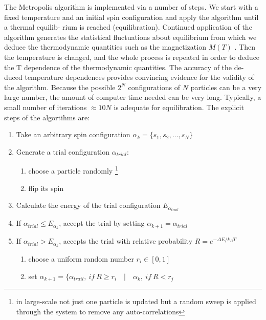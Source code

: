 \documentclass[12pt]{article}
\theoremstyle{plain}
\begin{document}
\vspace{2mm}

\par The Metropolis algorithm is implemented via a number of steps. We start with a fixed
temperature and an initial spin configuration and apply the algorithm until a thermal equilib-
rium is reached (equilibration). Continued application of the algorithm generates the statistical
fluctuations about equilibrium from which we deduce the thermodynamic quantities such as
the magnetization $M (T )$ . Then the temperature is changed, and the whole process is repeated
in order to deduce the T dependence of the thermodynamic quantities. The accuracy of the de-
duced temperature dependences provides convincing evidence for the validity of the algorithm.
Because the possible $2^N$ configurations of $N$ particles can be a very large number, the amount
of computer time needed can be very long. Typically, a small number of iterations $\approx 10N$ is
adequate for equilibration. The explicit steps of the algortihms are:

\vspace{2mm}

\begin{enumerate}
    \item Take an arbitrary spin configuration $\alpha_k = \{ s_1, s_2, ..., s_N \}$
    \item Generate a trial configuration $\alpha_{trial}$:
    \begin{enumerate}
        \item choose a particle randomly \footnote{in large-scale not just one particle is updated but a random sweep is applied through the system to remove any auto-correlations}
        \item flip its spin
    \end{enumerate}
    \item Calculate the energy of the trial configuration $E_{\alpha_{trail}}$
    \item If $\alpha_{trial} \leq E_{\alpha_k}$, accept the trial by setting $\alpha_{k + 1} = \alpha_{trial}$
    \item If $\alpha_{trial} > E_{\alpha_k}$, accepts the trial with relative probability $R = e^{-\Delta E / k_B T}$
    \begin{enumerate}
        \item choose a uniform random number $r_i \in [0, 1]$
        \item set $\alpha_{k+1} = \{\alpha_{trail}, ~ if ~ R \geq r_i \quad | \quad \alpha_k, ~ if ~ R < r_j$
    \end{enumerate}
\end{enumerate}
\end{document}
